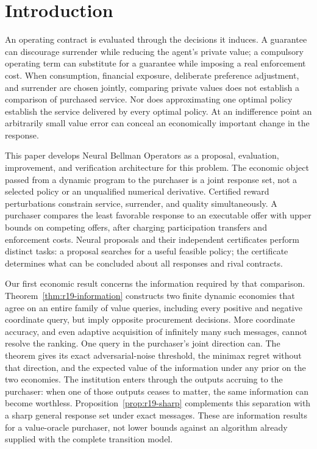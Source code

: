 \section{Introduction}
An operating contract is evaluated through the decisions it induces. A guarantee can discourage surrender while reducing the agent's private value; a compulsory operating term can substitute for a guarantee while imposing a real enforcement cost. When consumption, financial exposure, deliberate preference adjustment, and surrender are chosen jointly, comparing private values does not establish a comparison of purchased service. Nor does approximating one optimal policy establish the service delivered by every optimal policy. At an indifference point an arbitrarily small value error can conceal an economically important change in the response.

This paper develops Neural Bellman Operators as a proposal, evaluation, improvement, and verification architecture for this problem. The economic object passed from a dynamic program to the purchaser is a joint response set, not a selected policy or an unqualified numerical derivative. Certified reward perturbations constrain service, surrender, and quality simultaneously. A purchaser compares the least favorable response to an executable offer with upper bounds on competing offers, after charging participation transfers and enforcement costs. Neural proposals and their independent certificates perform distinct tasks: a proposal searches for a useful feasible policy; the certificate determines what can be concluded about all responses and rival contracts.

Our first economic result concerns the information required by that comparison. Theorem~\ref{thm:r19-information} constructs two finite dynamic economies that agree on an entire family of value queries, including every positive and negative coordinate query, but imply opposite procurement decisions. More coordinate accuracy, and even adaptive acquisition of infinitely many such messages, cannot resolve the ranking. One query in the purchaser's joint direction can. The theorem gives its exact adversarial-noise threshold, the minimax regret without that direction, and the expected value of the information under any prior on the two economies. The institution enters through the outputs accruing to the purchaser: when one of those outputs ceases to matter, the same information can become worthless. Proposition~\ref{prop:r19-sharp} complements this separation with a sharp general response set under exact messages. These are information results for a value-oracle purchaser, not lower bounds against an algorithm already supplied with the complete transition model.

